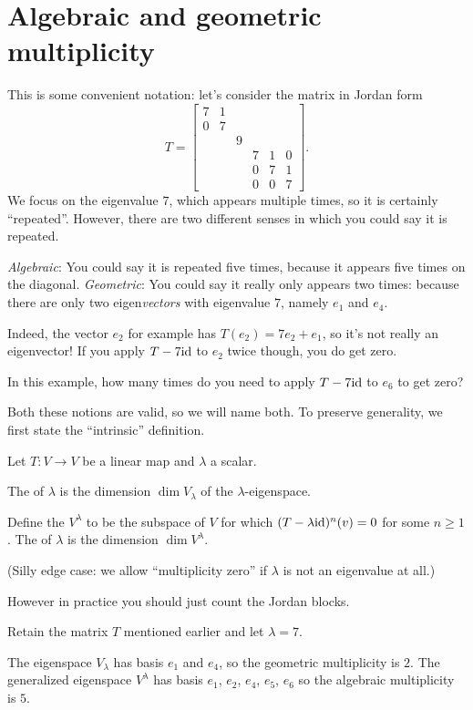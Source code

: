 \section{Algebraic and geometric multiplicity}
This is some convenient notation:
let's consider the matrix in Jordan form
\[
	T =
	\begin{bmatrix}
		7 & 1 \\
		0 & 7 \\
		& & 9 \\
		& & & 7 & 1 & 0 \\
		& & & 0 & 7 & 1 \\
		& & & 0 & 0 & 7
	\end{bmatrix}.
\]
We focus on the eigenvalue $7$,
which appears multiple times, so it is certainly ``repeated''.
However, there are two different senses in which you could say it is repeated.
\begin{itemize}
	\ii \emph{Algebraic}: You could say it is repeated five times,
	because it appears five times on the diagonal.
	\ii \emph{Geometric}: You could say it really only appears two times:
	because there are only two eigen\emph{vectors}
	with eigenvalue $7$, namely $e_1$ and $e_4$.

	Indeed, the vector $e_2$ for example has $T(e_2) = 7e_2 + e_1$,
	so it's not really an eigenvector!
	If you apply $T - 7\mathrm{id}$ to $e_2$ twice though,
	you do get zero.
\end{itemize}
\begin{ques}
	In this example,
	how many times do you need to apply $T - 7\mathrm{id}$ to $e_6$ to get zero?
\end{ques}
Both these notions are valid,
so we will name both.
To preserve generality,
we first state the ``intrinsic'' definition.
\begin{definition}
	Let $T \colon V \to V$ be a linear map and $\lambda$ a scalar.
	\begin{itemize}
		\ii The 
		of $\lambda$ is the dimension $\dim V_\lambda$
		of the $\lambda$-eigenspace.

		\ii Define the 
		$V^\lambda$ to be the subspace of $V$
		for which $(T-\lambda \mathrm{id})^n(v) = 0$ for some $n \ge 1$.
		The  of $\lambda$ is the
		dimension $\dim V^\lambda$.
	\end{itemize}
	(Silly edge case: we allow ``multiplicity zero''
	if $\lambda$ is not an eigenvalue at all.)
\end{definition}
However in practice you should just count the Jordan blocks.
\begin{example}
	Retain the matrix $T$ mentioned earlier and let $\lambda = 7$.
	\begin{itemize}
		\ii The eigenspace $V_\lambda$ has basis $e_1$ and $e_4$,
		so the geometric multiplicity is $2$.
		\ii The generalized eigenspace $V^\lambda$ has basis $e_1$, $e_2$,
		$e_4$, $e_5$, $e_6$ so the algebraic multiplicity is $5$.
	\end{itemize}
\end{example}

